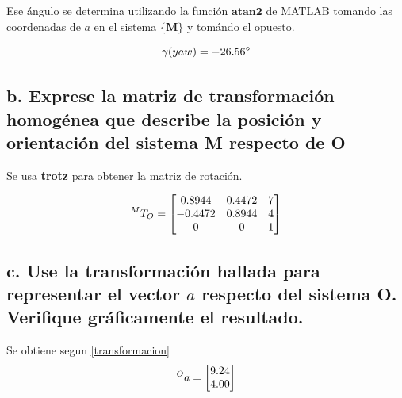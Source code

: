 \documentclass[a4paper,12pt]{article}
\begin{document}
Ese ángulo se determina utilizando la función $\mathbf{atan2}$ de MATLAB tomando las coordenadas
de $a$ en el sistema $\mathbf{\{M\}}$ y tomándo el opuesto.

\[
    \gamma \text(yaw) = -26.56^\circ
\]

\subsection{b. Exprese la matriz de transformación homogénea que describe la posición y orientación
del sistema {M} respecto de {O}}

Se usa \textbf{trotz} para obtener la matriz de rotación.

\begin{equation*}
    \prescript{M}{}{T_O} = 
    \begin{bmatrix}
        0.8944  & 0.4472       & 7 \\
        -0.4472 & 0.8944       & 4 \\
        0       & 0            & 1
    \end{bmatrix}
\end{equation*}

\subsection{c. Use la transformación hallada para representar el vector $a$ respecto del sistema {O}.
Verifique gráficamente el resultado.}

Se obtiene segun \cref{transformacion}
\[
    \prescript{O}{}{a} =
    \begin{bmatrix}
        9.24\\
        4.00
    \end{bmatrix}
\]
\end{document}
